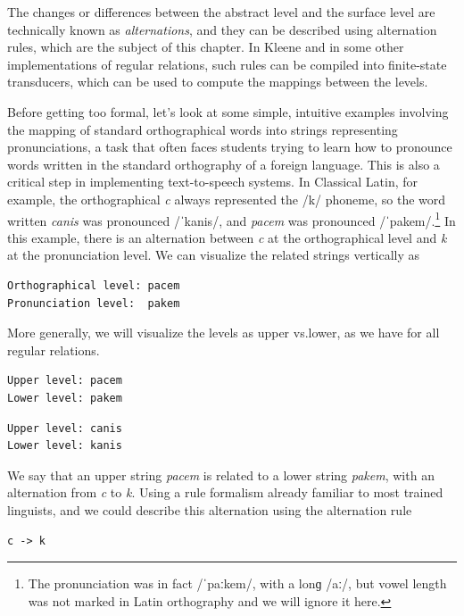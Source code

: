\noindent
The changes or differences between the abstract level and the surface level are
technically known as \emph{alternations}, and they can be described using alternation rules, which are the
subject of this chapter.  In
Kleene and in some other implementations of regular relations, 
such rules can be compiled into finite-state transducers, which can be
used to compute the mappings between the levels.

Before getting too formal, let's look at some simple, intuitive examples involving the
mapping of standard
orthographical words into strings representing pronunciations, a task that often faces students trying
to learn how to pronounce words written in the standard orthography of a
foreign language.  This is also a critical step in implementing
text-to-speech systems.  In Classical
Latin, for example, the orthographical \emph{c} always represented
the /k/ phoneme, so the word written \emph{canis} was
pronounced /ˈkanis/, and \emph{pacem} was pronounced
/ˈpakem/.\footnote{The pronunciation was in fact /ˈpaːkem/, with a lonɡ
/aː/, but vowel length was not marked in Latin orthography and we will
ignore it here.} In this example,
there is an alternation between \emph{c} at the orthographical level and
\emph{k} at the pronunciation level.  We can visualize the related strings vertically as

\begin{Verbatim}
Orthographical level: pacem
Pronunciation level:  pakem
\end{Verbatim}

\noindent
More generally, we will visualize the levels as upper vs.\@ lower, as we have for all regular
relations.

\begin{Verbatim}
Upper level: pacem
Lower level: pakem
\end{Verbatim}

\begin{Verbatim}
Upper level: canis
Lower level: kanis
\end{Verbatim}

\noindent
We say that an upper string \emph{pacem} is related to a lower string
\emph{pakem}, with an alternation from \emph{c} to \emph{k}.
Using a rule formalism already familiar to most trained linguists, and we could describe this alternation
using the alternation rule

\begin{Verbatim}
c -> k
\end{Verbatim}

